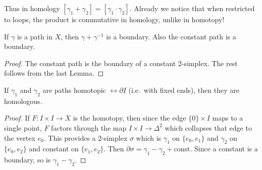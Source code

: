 Thus in homology $[\gamma_1+\gamma_2]=[\gamma_1\cdot\gamma_2]$. Already we notice that when restricted to loops, the product is commutative in homology, unlike in homotopy!

\begin{lem}
    If $\gamma$ is a path in $X$, then $\gamma+\gamma^{-1}$ is a boundary. Also the constant path is a boundary.
\end{lem}
\begin{proof}
     The constant path is the boundary of a constant 2-simplex. The rest follows from the last Lemma.
\end{proof}

\begin{lem}
    If $\gamma_1$ and $\gamma_2$ are paths homotopic $\rel \partial I$ (i.e.\ with fixed ends), then they are homologous.
\end{lem}
\begin{proof}
     If $F:I\times I\to X$ is the homotopy, then since the edge $\{0\}\times I$ maps to a single point, $F$ factors through the map $I\times I\to \Delta^2$ which collapses that edge to the vertex $e_0$. This provides a 2-simplex $\sigma$ which is $\gamma_1$ on $\{e_0,e_1\}$ and $\gamma_2$ on $\{e_0,e_2\}$ and constant on $\{e_1,e_2\}$. Then $\partial\sigma=\gamma_1-\gamma_2+\text{const}$. Since a constant is a boundary, so is $\gamma_1-\gamma_2$.
\end{proof}

